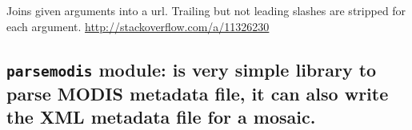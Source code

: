 \documentclass[a4paper,11pt,oneside]{sphinxmanual}
\begin{document}

\begin{fulllineitems}
\label{pymodis/pymodis:pymodis.downmodis.urljoin}
Joins given arguments into a url. Trailing but not leading slashes are
stripped for each argument.
\href{http://stackoverflow.com/a/11326230}{http://stackoverflow.com/a/11326230}

\end{fulllineitems}



\subsection{\texttt{parsemodis} module: is very simple library to parse MODIS metadata file, it can also write the XML metadata file for a mosaic.}
\label{pymodis/pymodis:parsemodis-module-is-very-simple-library-to-parse-modis-metadata-file-it-can-also-write-the-xml-metadata-file-for-a-mosaic}\label{pymodis/pymodis:module-pymodis.parsemodis}
\end{document}
